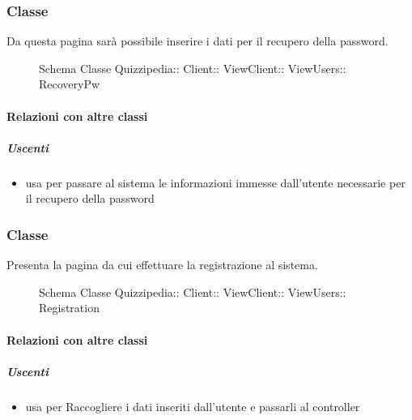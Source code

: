 \subsubsection{Classe }
Da questa pagina sarà possibile inserire i dati per il recupero della password.
\begin{figure}[H]
\centering
\noindent{}
\caption[Schema Classe RecoveryPw]{Schema Classe Quizzipedia:: Client:: ViewClient:: ViewUsers:: RecoveryPw}
\end{figure}
\paragraph{Relazioni con altre classi}
\subparagraph{Uscenti}
\begin{itemize}
\item usa  per passare al sistema le informazioni immesse dall'utente necessarie per il recupero della password
\end{itemize}
\subsubsection{Classe }
Presenta la pagina da cui effettuare la  registrazione al sistema.
\begin{figure}[H]
\centering
\noindent{}
\caption[Schema Classe Registration]{Schema Classe Quizzipedia:: Client:: ViewClient:: ViewUsers:: Registration}
\end{figure}
\paragraph{Relazioni con altre classi}
\subparagraph{Uscenti}
\begin{itemize}
\item usa  per Raccogliere i dati inseriti dall'utente e passarli al controller
\end{itemize}
